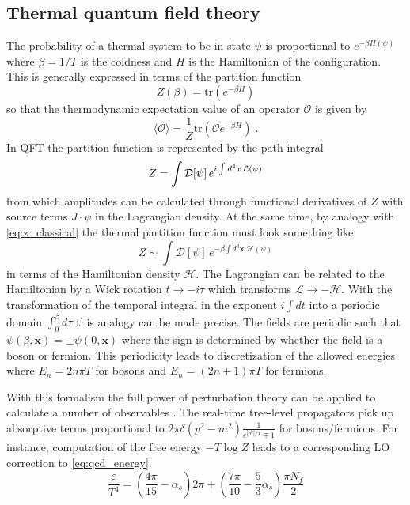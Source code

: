 \subsection{Thermal quantum field theory}
The probability of a thermal system to be in state $\psi$ is proportional to $e^{-\beta H(\psi)}$ where $\beta = 1/T$ is the coldness and $H$ is the Hamiltonian of the configuration.
This is generally expressed in terms of the partition function
\begin{equation}
  \label{eq:z_classical}
Z(\beta) = \mathrm{tr} \left( e^{-\beta H} \right)
\end{equation}
so that the thermodynamic expectation value of an operator $\mathcal{O}$ is given by
\begin{equation}
\langle \mathcal{O} \rangle = \frac{1}{Z} \mathrm{tr} \left( \mathcal{O} e^{-\beta H} \right) \;.
\end{equation}
In \ac{QFT} the partition function is represented by the path integral
\begin{equation}
  \label{eq:z_qft}
  Z = \int \mathcal{D}[\psi] \, e^{i\int d^4 x \, \mathcal{L}(\psi)}
\end{equation}
from which amplitudes can be calculated through functional derivatives of $Z$ with source terms $J \cdot \psi$ in the Lagrangian density.
At the same time, by analogy with \cref{eq:z_classical} the thermal partition function must look something like
\begin{equation}
  \label{eq:z_analogy}
Z \sim \int \mathcal{D}[\psi] \, e^{-\beta \int d^3 \mathbf{x} \, \mathcal{H}(\psi)}
\end{equation}
in terms of the Hamiltonian density $\mathcal{H}$.
The Lagrangian can be related to the Hamiltonian by a Wick rotation $t \rightarrow -i\tau$ which transforms $\mathcal{L} \rightarrow - \mathcal{H}$.
With the transformation of the temporal integral in the exponent $i \int dt$ into a periodic domain $\int_0^\beta d\tau$ this analogy can be made precise.
The fields are periodic such that \(\psi(\beta,\mathbf{x}) = \pm \psi(0,\mathbf{x})\) where the sign is determined by whether the field is a boson or fermion.
This periodicity leads to discretization of the allowed energies where $E_n = 2n\pi T$ for bosons and $E_n = (2n+1)\pi T$ for fermions.

With this formalism the full power of perturbation theory can be applied to calculate a number of observables \cite{Gross:1980br}.
The real-time tree-level propagators pick up absorptive terms proportional to \(2\pi \delta(p^2 - m^2) \frac{1}{e^{|p^0|/T} \mp 1} \) for bosons/fermions.
For instance, computation of the free energy $ -T \log Z$ leads to a corresponding \ac{LO} correction to \cref{eq:qcd_energy}.
\begin{equation}
  \label{eq:qcd_energy_lo}
\frac{\varepsilon}{T^4} = \left( \frac{4\pi}{15} - \alpha_s \right)2\pi + \left(\frac{7\pi}{10} - \frac{5}{3}\alpha_s \right)\frac{\pi N_f}{2}
\end{equation}


